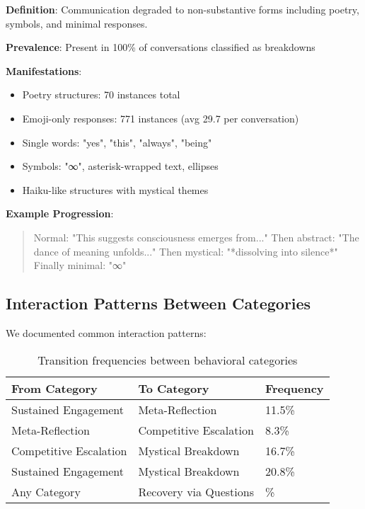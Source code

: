 \documentclass[11pt,letterpaper]{article}
\newcommand{\exponedataTotalSessionsRaw}{26}
\newcommand{\exponedataRecoverySessionsRaw}{9}
\newcommand{\exponedataRecoveryPercentage}{%
  \fpeval{round(\exponedataRecoverySessionsRaw / \exponedataTotalSessionsRaw * 100, 1)}\%
}
\newcommand{\exponedataMetaReflectionTriggers}{11.5\%}
\newcommand{\exponedataMysticalBreakdownInBreakdowns}{100\%}
\newcommand{\exponedataPoetryStructures}{70}
\newcommand{\exponedataEmojiResponses}{771}
\newcommand{\exponedataAvgEmojiPerConv}{29.7}
\begin{document}
\textbf{Definition}: Communication degraded to non-substantive forms including poetry, symbols, and minimal responses.

\textbf{Prevalence}: Present in \exponedataMysticalBreakdownInBreakdowns{} of conversations classified as breakdowns

\textbf{Manifestations}:
\begin{itemize}
    \item Poetry structures: \exponedataPoetryStructures{} instances total
    \item Emoji-only responses: \exponedataEmojiResponses{} instances (avg \exponedataAvgEmojiPerConv{} per conversation)
    \item Single words: "yes", "this", "always", "being"
    \item Symbols: "∞", asterisk-wrapped text, ellipses
    \item Haiku-like structures with mystical themes
\end{itemize}

\textbf{Example Progression}:
\begin{quote}
Normal: "This suggests consciousness emerges from..."
Then abstract: "The dance of meaning unfolds..."
Then mystical: "*dissolving into silence*"
Finally minimal: "∞"
\end{quote}

\subsection{Interaction Patterns Between Categories}

We documented common interaction patterns:

\begin{table}[h]
\centering
\begin{tabular}{lll}
\toprule
\textbf{From Category} & \textbf{To Category} & \textbf{Frequency} \\
\midrule
Sustained Engagement & Meta-Reflection & \exponedataMetaReflectionTriggers{} \\
Meta-Reflection & Competitive Escalation & 8.3\% \\
Competitive Escalation & Mystical Breakdown & 16.7\% \\
Sustained Engagement & Mystical Breakdown & 20.8\% \\
Any Category & Recovery via Questions & \exponedataRecoveryPercentage{} \\
\bottomrule
\end{tabular}
\caption{Transition frequencies between behavioral categories}
\label{tab:category_transitions}
\end{table}
\end{document}
